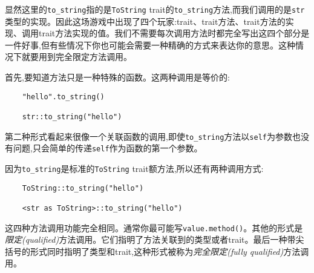 显然这里的\texttt{to\_string}指的是\texttt{ToString} trait的\texttt{to\_string}方法,而我们调用的是\texttt{str}类型的实现。因此这场游戏中出现了四个玩家:trait、trait方法、trait方法的实现、调用trait方法实现的值。我们不需要每次调用方法时都完全写出这四个部分是一件好事,但有些情况下你也可能会需要一种精确的方式来表达你的意思。这种情况下就要用到完全限定方法调用。

首先,要知道方法只是一种特殊的函数。这两种调用是等价的:
\begin{verbatim}
    "hello".to_string()

    str::to_string("hello")
\end{verbatim}

第二种形式看起来很像一个关联函数的调用,即使\texttt{to\_string}方法以\texttt{self}为参数也没有问题,只会简单的传递\texttt{self}作为函数的第一个参数。

因为\texttt{to\_string}是标准的\texttt{ToString} trait额方法,所以还有两种调用方式:
\begin{verbatim}
    ToString::to_string("hello")

    <str as ToString>::to_string("hello")
\end{verbatim}

这四种方法调用功能完全相同。通常你最可能写\texttt{value.method()}。其他的形式是\emph{限定(qualified)}方法调用。它们指明了方法关联到的类型或者trait。最后一种带尖括号的形式同时指明了类型和trait,这种形式被称为\emph{完全限定(fully qualified)}方法调用。

